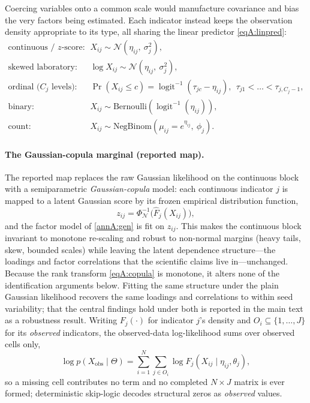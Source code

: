 Coercing variables onto a common scale would manufacture covariance and bias the very
factors being estimated. Each indicator instead keeps the observation density
appropriate to its type, all sharing the linear predictor \eqref{eqA:linpred}:
\begin{align}
  \text{continuous / $z$-score:}\quad & X_{ij}\sim \mathcal{N}(\eta_{ij},\ \sigma_j^2), \\
  \text{skewed laboratory:}\quad & \log X_{ij}\sim \mathcal{N}(\eta_{ij},\ \sigma_j^2), \\
  \text{ordinal ($C_j$ levels):}\quad & \Pr(X_{ij}\le c)=\operatorname{logit}^{-1}(\tau_{jc}-\eta_{ij}),\ \ \tau_{j1}<\dots<\tau_{j,C_j-1}, \\
  \text{binary:}\quad & X_{ij}\sim \mathrm{Bernoulli}\!\left(\operatorname{logit}^{-1}(\eta_{ij})\right), \\
  \text{count:}\quad & X_{ij}\sim \mathrm{NegBinom}\!\left(\mu_{ij}=e^{\eta_{ij}},\ \phi_j\right).
\end{align}

\paragraph{The Gaussian-copula marginal (reported map).} The reported map replaces the
raw Gaussian likelihood on the continuous block with a semiparametric
\emph{Gaussian-copula} model: each continuous indicator $j$ is mapped to a latent
Gaussian score by its frozen empirical distribution function,
\begin{equation}
  z_{ij}=\Phi_{\mathcal N}^{-1}\!\big(\hat F_j(X_{ij})\big),
  \label{eqA:copula}
\end{equation}
and the factor model of \ref{annA:gen} is fit on $z_{ij}$. This makes the continuous
block invariant to monotone re-scaling and robust to non-normal margins (heavy tails,
skew, bounded scales) while leaving the latent dependence structure---the loadings and
factor correlations that the scientific claims live in---unchanged. Because the
rank transform \eqref{eqA:copula} is monotone, it alters none of the
identification arguments below. Fitting the same structure under the plain Gaussian
likelihood recovers the same loadings and correlations to within seed variability;
that the central findings hold under both is reported in the main text as a
robustness result. Writing $F_j(\cdot)$ for indicator $j$'s density and
$O_i\subseteq\{1,\dots,J\}$ for its \emph{observed} indicators, the observed-data
log-likelihood sums over observed cells only,
\begin{equation}
  \log p(X_{\mathrm{obs}}\mid\Theta)=\sum_{i=1}^{N}\sum_{j\in O_i}\log F_j\!\left(X_{ij}\mid\eta_{ij},\theta_j\right),
  \label{eqA:obslik}
\end{equation}
so a missing cell contributes no term and no completed $N\times J$ matrix is ever
formed; deterministic skip-logic decodes structural zeros as \emph{observed} values.


